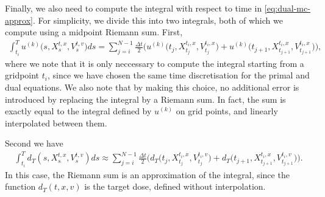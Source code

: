 \documentclass{article}  %
\begin{document}
Finally, we also need to compute the integral with respect to time in \autoref{eq:dual-mc-approx}. For simplicity, we divide this into two integrals, both of which we compute using a midpoint Riemann sum. First,
%
\begin{align}
    \int_{t_i}^{T} u^{(k)}\big(s,X_s^{t,x},V_s^{t,v}\big) ds = \sum_{j=i}^{N-1} \frac{\Delta t}{2} \bigg(u^{(k)}\big(t_j,X_{t_j}^{t_i,x},V_{t_j}^{t_i,x}\big) + u^{(k)}\big(t_{j+1},X_{t_{j+1}}^{t_i,x},V_{t_{j+1}}^{t_i,x}\big)\bigg),
\end{align}
% 
where we note that it is only neccessary to compute the integral starting from a gridpoint $t_i$, since we have chosen the same time discretisation for the primal and dual equations. We also note that by making this choice, no additional error is introduced by replacing the integral by a Riemann sum. In fact, the sum is exactly equal to the integral defined by $u^{(k)}$ on grid points, and linearly interpolated between them. 

Second we have
%
\begin{align}
    \int_{t_i}^{T} d_T(s,X_s^{t,x},V_s^{t,v}) ds \approx \sum_{j=i}^{N-1} \frac{\Delta t}{2} \bigg( d_T\big(t_j,X_{t_j}^{t_i,x},V_{t_j}^{t_i,v}\big) + d_T\big(t_{j+1},X_{t_{j+1}}^{t_i,x},V_{t_{j+1}}^{t_i,v}\big) \bigg).
\end{align}
%
In this case, the Riemann sum is an approximation of the integral, since the function $d_T(t,x,v)$ is the target dose, defined without interpolation.

% 
% 
\nocite{*}
\printbibliography
%
\end{document}
